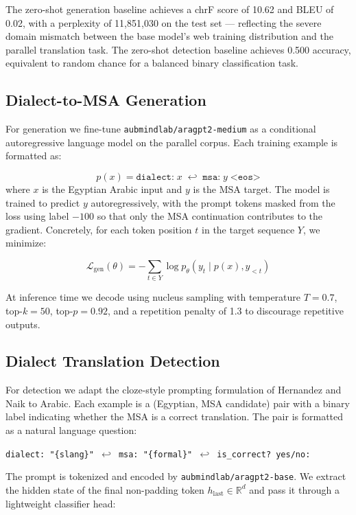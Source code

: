 \documentclass[11pt]{article}
\begin{document}
The zero-shot generation baseline achieves a chrF score of 10.62 and BLEU of 0.02, with a perplexity of 11,851,030 on the test set — reflecting the severe domain mismatch between the base model's web training distribution and the parallel translation task. The zero-shot detection baseline achieves 0.500 accuracy, equivalent to random chance for a balanced binary classification task.

\subsection{Dialect-to-MSA Generation}

For generation we fine-tune \texttt{aubmindlab/aragpt2-medium} as a conditional autoregressive language model on the parallel corpus. Each training example is formatted as:

\begin{equation}
p(x) = \texttt{dialect:}\; x \;\hookleftarrow\; \texttt{msa:}\; y \;\texttt{<eos>}
\end{equation}
where $x$ is the Egyptian Arabic input and $y$ is the MSA target. The model is trained to predict $y$ autoregressively, with the prompt tokens masked from the loss using label $-100$ so that only the MSA continuation contributes to the gradient. Concretely, for each token position $t$ in the target sequence $Y$, we minimize:

\begin{equation}
\mathcal{L}_{\text{gen}}(\theta) = -\sum_{t \in Y} \log p_\theta(y_t \mid p(x), y_{<t})
\end{equation}

At inference time we decode using nucleus sampling with temperature $T = 0.7$, top-$k = 50$, top-$p = 0.92$, and a repetition penalty of 1.3 to discourage repetitive outputs.

\subsection{Dialect Translation Detection}

For detection we adapt the cloze-style prompting formulation of Hernandez and Naik \cite{hernandez2025} to Arabic. Each example is a (Egyptian, MSA candidate) pair with a binary label indicating whether the MSA is a correct translation. The pair is formatted as a natural language question:

\begin{center}
\texttt{dialect: "\{slang\}" $\hookleftarrow$ msa: "\{formal\}" $\hookleftarrow$ is\_correct? yes/no:}
\end{center}
The prompt is tokenized and encoded by \texttt{aubmindlab/aragpt2-base}. We extract the hidden state of the final non-padding token $h_{\text{last}} \in \mathbb{R}^d$ and pass it through a lightweight classifier head:
\end{document}
